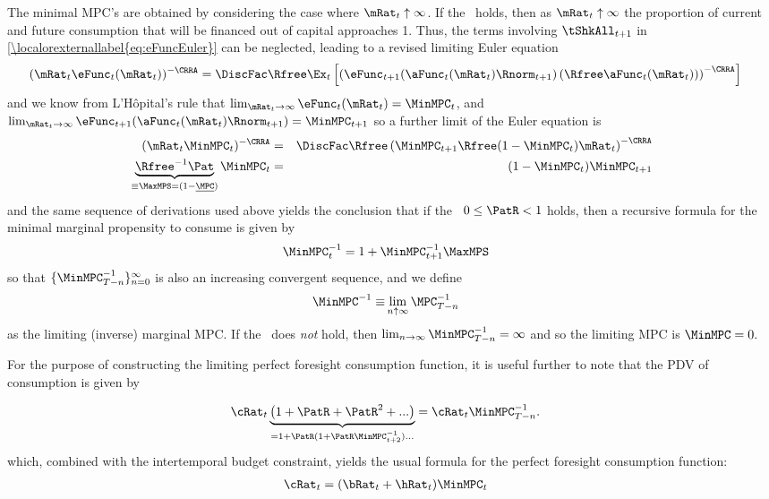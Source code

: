 \documentclass[\econtexRoot/BufferStockTheory]{subfiles}
\begin{document}
The minimal MPC's are obtained by considering the case where
$\mRat_{t} \uparrow \infty$.  If the \FHWC~holds, then as
$\mRat_{t} \uparrow \infty$ the proportion of current and future
consumption that will be financed out of capital approaches 1.  Thus,
the terms involving $\tShkAll_{t+1}$ in \eqref{\localorexternallabel{eq:eFuncEuler}} can be
neglected, leading to a revised limiting Euler equation
\begin{eqnarray*}
 ({\mRat_{t}}\eFunc_{t}(\mRat_{t}))^{-\CRRA}  & = \DiscFac \Rfree \Ex_{t}\left[\left(\eFunc_{t+1}(\aFunc_{t}(\mRat_{t})\Rnorm_{t+1})\left({\Rfree \aFunc_{t}(\mRat_{t})}\right)\right)^{-\CRRA}\right]
\end{eqnarray*}
and we know from L'H\^opital's rule that $\lim_{\mRat_{t} \rightarrow \infty} \eFunc_{t}(\mRat_{t}) = \MinMPC_{t}$, and $\lim_{\mRat_{t} \rightarrow \infty} \eFunc_{t+1}(\aFunc_{t}(\mRat_{t})\Rnorm_{t+1}) = \MinMPC_{t+1}$ so a further limit of the Euler equation is\hypertarget{MPCnvrs}{}
\begin{eqnarray*}
  (\mRat_{t}\MinMPC_{t})^{-\CRRA}  & = & \DiscFac \Rfree \left(\MinMPC_{t+1} \Rfree (1-\MinMPC_{t})\mRat_{t}\right)^{-\CRRA}
\\ \underbrace{{\Rfree}^{-1}{\Pat}}_{\equiv \MaxMPS = (1-\ushort{\MPC})} \MinMPC_{t}  & = & (1-\MinMPC_{t}) \MinMPC_{t+1}
\end{eqnarray*}
and the same sequence of derivations used above yields the conclusion
that if the \RIC~$0 \leq \PatR < 1$ holds, then a recursive formula for the
minimal marginal propensity to consume is given by
\begin{align}
 \MinMPC_{t}^{-1}  & = 1+\MinMPC_{t+1}^{-1}\MaxMPS  \label{eq:MinMPCInvApndx}
\end{align}
so that $\{\MinMPC_{T-n}^{-1}\}_{n=0}^{\infty}$ is also an increasing
convergent sequence, and we define
\begin{align}
\MinMPC^{-1} \equiv &\lim_{n \uparrow \infty} \MPC_{T-n}^{-1}  
\end{align}
as the limiting (inverse) marginal MPC.  If the \RIC~does \textit{not} hold, then $\lim_{n \rightarrow \infty} \MinMPC_{T-n}^{-1} = \infty$
and so the limiting MPC is $\MinMPC = 0.$

For the purpose of constructing the limiting perfect foresight consumption function, it is useful further to note that
the PDV of consumption is given by\hypertarget{MPCnvrsIsCPDV}{}

\begin{eqnarray*}
  \cRat_{t}\underbrace{\left(1 + \PatR + \PatR^{2} + ... \right)}_{=1+\PatR(1+\PatR\MinMPC_{t+2}^{-1})...}   & = \cRat_{t}\MinMPC_{T-n}^{-1}.
\end{eqnarray*}
which, combined with the intertemporal budget constraint, yields the usual formula for the perfect foresight consumption function:
\begin{align}
  \cRat_{t} & = (\bRat_{t}+\hRat_{t})\MinMPC_{t}
\end{align}
\end{document}
